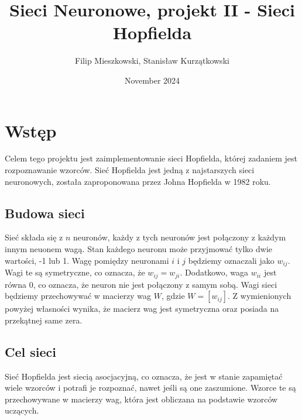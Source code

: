 \documentclass{article}
\title{Sieci Neuronowe, projekt II - Sieci Hopfielda}
\author{Filip Mieszkowski, Stanisław Kurzątkowski}
\date{November 2024}
\begin{document}
\maketitle

\section{Wstęp}
Celem tego projektu jest zaimplementowanie sieci Hopfielda, której zadaniem jest rozpoznawanie wzorców. 
Sieć Hopfielda jest jedną z najstarszych sieci neuronowych, została zaproponowana przez Johna Hopfielda w 1982 roku. 

\subsection{Budowa sieci}
Sieć składa się z $n$ neuronów, każdy z tych neuronów jest połączony z każdym innym neuonem wagą. 
Stan każdego neuronu może przyjmować tylko dwie wartości, -1 lub 1.
Wagę pomiędzy neuronami $i$ i $j$ będziemy oznaczali jako $w_{ij}$.
Wagi te są symetryczne, co oznacza, że $w_{ij} = w_{ji}$. 
Dodatkowo, waga $w_{ii}$ jest równa 0, co oznacza, że neuron nie jest połączony z samym sobą.
Wagi sieci będziemy przechowywać w macierzy wag $W$, gdzie $W = [w_{ij}]$.
Z wymienionych powyżej własności wynika, że macierz wag jest symetryczna oraz posiada na przekątnej same zera.


\subsection{Cel sieci}
Sieć Hopfielda jest siecią asocjacyjną, co oznacza, że jest w stanie zapamiętać wiele wzorców i potrafi je rozpoznać, 
nawet jeśli są one zaszumione. Wzorce te są przechowywane w macierzy wag, która jest obliczana na podstawie wzorców uczących.


\section{}
 
\end{document}
